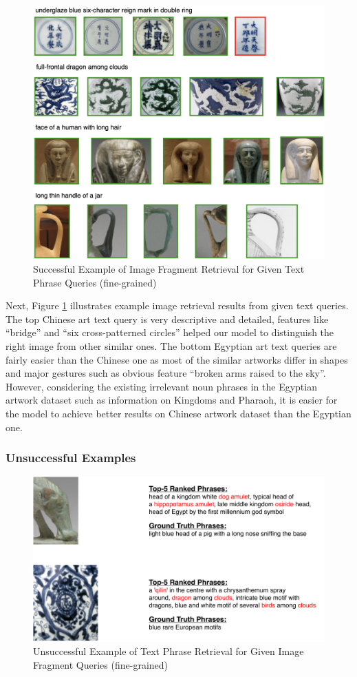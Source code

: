 \begin{figure}[h!]
\centering
\includegraphics[width=.9\textwidth]{t2i.png}
\caption{Successful Example of Image Fragment Retrieval for Given Text Phrase Queries (fine-grained)}
\label{fig:t2i}
\end{figure}

Next, Figure \ref{fig:t2i} illustrates example image retrieval results from given text queries. The top Chinese art text query is very descriptive and detailed, features like ``bridge'' and ``six cross-patterned circles'' helped our model to distinguish the right image from other similar ones. The bottom Egyptian art text queries are fairly easier than the Chinese one as most of the similar artworks differ in shapes and major gestures such as obvious feature ``broken arms raised to the sky''. However, considering the existing irrelevant noun phrases in the Egyptian artwork dataset such as information on Kingdoms and Pharaoh, it is easier for the model to achieve better results on Chinese artwork dataset than the Egyptian one.


\subsubsection{Unsuccessful Examples}

\begin{figure}[h!]
\centering
\includegraphics[width=.8\textwidth]{badi2t.pdf}
\caption{Unsuccessful Example of Text Phrase Retrieval for Given Image Fragment Queries (fine-grained)}
\label{fig:badi2t}
\end{figure}

